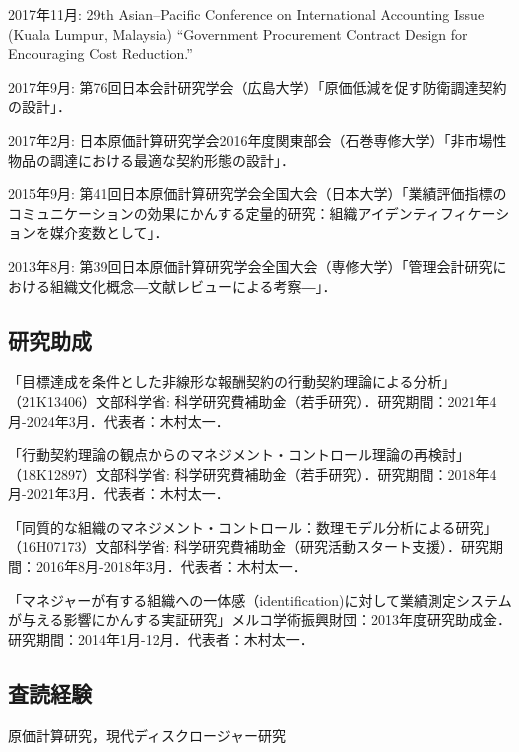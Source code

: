 \documentclass[letterpaper,uplatex]{article}
\renewenvironment{itemize}{
  \begin{list}{}{
    \setlength{\leftmargin}{1.5em}
  }
}{
  \end{list}
}
\begin{document}
\begin{itemize}
	\item 2017年11月: 29th Asian--Pacific Conference on International Accounting Issue (Kuala Lumpur, Malaysia) ``Government Procurement Contract Design for Encouraging Cost Reduction.''

	\item 2017年9月: 第76回日本会計研究学会（広島大学）「原価低減を促す防衛調達契約の設計」．

	\item 2017年2月: 日本原価計算研究学会2016年度関東部会（石巻専修大学）「非市場性物品の調達における最適な契約形態の設計」．

	\item 2015年9月: 第41回日本原価計算研究学会全国大会（日本大学）「業績評価指標のコミュニケーションの効果にかんする定量的研究：組織アイデンティフィケーションを媒介変数として」．

	\item 2013年8月: 第39回日本原価計算研究学会全国大会（専修大学）「管理会計研究における組織文化概念―文献レビューによる考察―」．
\end{itemize}

\subsection*{研究助成}

\begin{itemize}
\item 「目標達成を条件とした非線形な報酬契約の行動契約理論による分析」（21K13406）文部科学省: 科学研究費補助金（若手研究）．研究期間：2021年4月-2024年3月．代表者：木村太一．

\item 「行動契約理論の観点からのマネジメント・コントロール理論の再検討」（18K12897）文部科学省: 科学研究費補助金（若手研究）．研究期間：2018年4月-2021年3月．代表者：木村太一．

\item 「同質的な組織のマネジメント・コントロール：数理モデル分析による研究」（16H07173）文部科学省: 科学研究費補助金（研究活動スタート支援）．研究期間：2016年8月-2018年3月．代表者：木村太一．

\item 「マネジャーが有する組織への一体感（identification)に対して業績測定システムが与える影響にかんする実証研究」メルコ学術振興財団：2013年度研究助成金．研究期間：2014年1月-12月．代表者：木村太一．
\end{itemize}

\subsection*{査読経験}
    \begin{itemize}
        \item 原価計算研究，現代ディスクロージャー研究
    \end{itemize}
\end{document}
